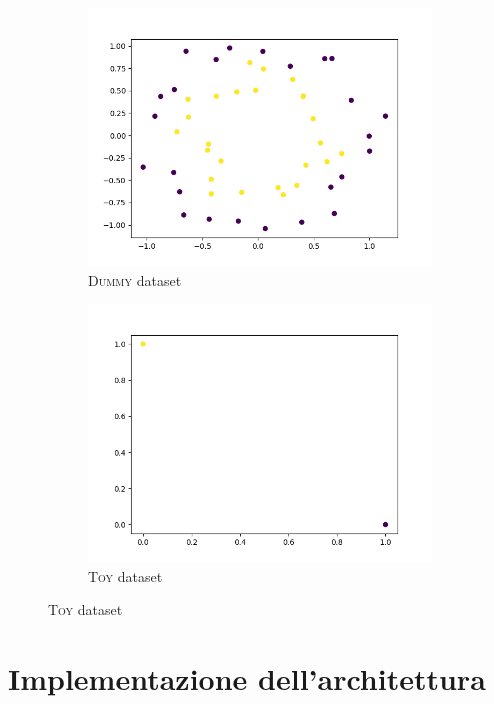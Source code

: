 \documentclass[12pt]{article}
\begin{document}
\begin{figure}[H]
    \centering
    \begin{subfigure}{.49\textwidth}
      \centering
      \includegraphics[width=\linewidth]{img/dummy.png}
      \caption{\textsc{Dummy} dataset}
    \end{subfigure}
    \begin{subfigure}{.49\textwidth}
      \centering
      \includegraphics[width=\linewidth]{img/toy.png}
      \caption{\textsc{Toy} dataset}
    \end{subfigure}
\end{figure}

\section{Implementazione dell'architettura}
\end{document}

